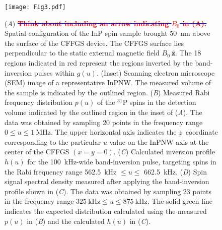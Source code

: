 \documentclass[9pt,twocolumn,twoside,lineno]{pnas-new}
\newcommand{\ST}[3][{}]{\textcolor{blue}{\sout{#2} #3\ul{#1}}}
\begin{document}
\begin{figure}[h]
    \centering
    \texttt{[image: Fig3.pdf]}
    \caption{(\textit{A}) \ST{\textcolor{red}{\textbf{Think about including an arrow indicating $B_0$ in (A).}}}{} Spatial configuration of the InP spin sample brought 50~nm above the surface of the CFFGS device. The CFFGS surface lies perpendicular to the static external magnetic field $B_0~\hat{\mathbf{z}}$.
    The 18 regions indicated in red represent the regions inverted by the band-inversion pulses within $g(u)$.  (Inset) Scanning electron microscope (SEM) image of a representative InPNW. The measured volume of the sample is indicated by the outlined region.
    (\textit{B}) Measured Rabi frequency distribution $p(u)$ of the $^{31}$P spins in the detection volume indicated by the outlined region in the inset of (\textit{A}). The data was obtained by sampling 20 points in the frequency range $0\leq u \leq 1~\text{MHz}$. The upper horizontal axis indicates the $z$~coordinate corresponding to the particular $u$ value on the InPNW axis at the center of the CFFGS $(x=y=0)$.
    (\textit{C}) Calculated inversion profile $h(u)$ for the 100~kHz-wide band-inversion pulse, targeting spins in the Rabi frequency range 562.5~kHz $\leq u \leq$ 662.5~kHz. (\textit{D}) Spin signal spectral density measured after applying the band-inversion profile shown in (\textit{C}).
    The data was obtained by sampling 23 points in the frequency range $325~\text{kHz} \leq u \leq 875~\text{kHz}$.
    The solid green line indicates the expected distribution calculated using the measured $p(u)$ in (\textit{B}) and the calculated $h(u)$ in (\textit{C}).}
    \label{fig:Fig3}
\end{figure}
\end{document}
